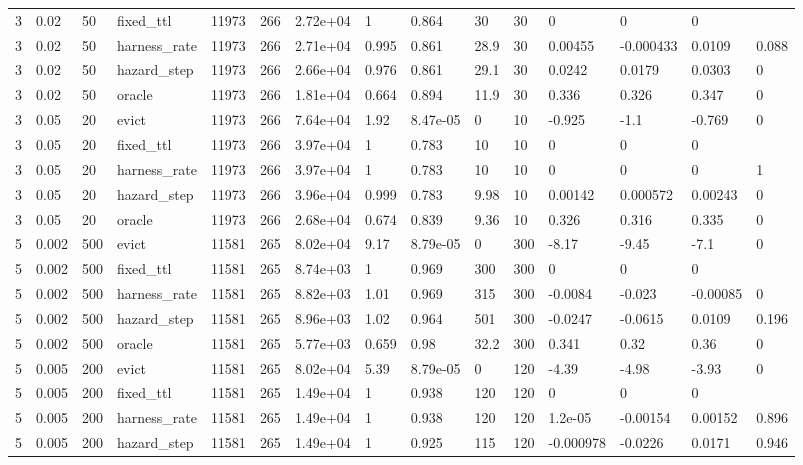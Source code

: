 \begin{tabular}{lllllllllllllll}
3 & 0.02 & 50 & fixed\_ttl & 11973 & 266 & 2.72e+04 & 1 & 0.864 & 30 & 30 & 0 & 0 & 0 &  \\
3 & 0.02 & 50 & harness\_rate & 11973 & 266 & 2.71e+04 & 0.995 & 0.861 & 28.9 & 30 & 0.00455 & -0.000433 & 0.0109 & 0.088 \\
3 & 0.02 & 50 & hazard\_step & 11973 & 266 & 2.66e+04 & 0.976 & 0.861 & 29.1 & 30 & 0.0242 & 0.0179 & 0.0303 & 0 \\
3 & 0.02 & 50 & oracle & 11973 & 266 & 1.81e+04 & 0.664 & 0.894 & 11.9 & 30 & 0.336 & 0.326 & 0.347 & 0 \\
3 & 0.05 & 20 & evict & 11973 & 266 & 7.64e+04 & 1.92 & 8.47e-05 & 0 & 10 & -0.925 & -1.1 & -0.769 & 0 \\
3 & 0.05 & 20 & fixed\_ttl & 11973 & 266 & 3.97e+04 & 1 & 0.783 & 10 & 10 & 0 & 0 & 0 &  \\
3 & 0.05 & 20 & harness\_rate & 11973 & 266 & 3.97e+04 & 1 & 0.783 & 10 & 10 & 0 & 0 & 0 & 1 \\
3 & 0.05 & 20 & hazard\_step & 11973 & 266 & 3.96e+04 & 0.999 & 0.783 & 9.98 & 10 & 0.00142 & 0.000572 & 0.00243 & 0 \\
3 & 0.05 & 20 & oracle & 11973 & 266 & 2.68e+04 & 0.674 & 0.839 & 9.36 & 10 & 0.326 & 0.316 & 0.335 & 0 \\
5 & 0.002 & 500 & evict & 11581 & 265 & 8.02e+04 & 9.17 & 8.79e-05 & 0 & 300 & -8.17 & -9.45 & -7.1 & 0 \\
5 & 0.002 & 500 & fixed\_ttl & 11581 & 265 & 8.74e+03 & 1 & 0.969 & 300 & 300 & 0 & 0 & 0 &  \\
5 & 0.002 & 500 & harness\_rate & 11581 & 265 & 8.82e+03 & 1.01 & 0.969 & 315 & 300 & -0.0084 & -0.023 & -0.00085 & 0 \\
5 & 0.002 & 500 & hazard\_step & 11581 & 265 & 8.96e+03 & 1.02 & 0.964 & 501 & 300 & -0.0247 & -0.0615 & 0.0109 & 0.196 \\
5 & 0.002 & 500 & oracle & 11581 & 265 & 5.77e+03 & 0.659 & 0.98 & 32.2 & 300 & 0.341 & 0.32 & 0.36 & 0 \\
5 & 0.005 & 200 & evict & 11581 & 265 & 8.02e+04 & 5.39 & 8.79e-05 & 0 & 120 & -4.39 & -4.98 & -3.93 & 0 \\
5 & 0.005 & 200 & fixed\_ttl & 11581 & 265 & 1.49e+04 & 1 & 0.938 & 120 & 120 & 0 & 0 & 0 &  \\
5 & 0.005 & 200 & harness\_rate & 11581 & 265 & 1.49e+04 & 1 & 0.938 & 120 & 120 & 1.2e-05 & -0.00154 & 0.00152 & 0.896 \\
5 & 0.005 & 200 & hazard\_step & 11581 & 265 & 1.49e+04 & 1 & 0.925 & 115 & 120 & -0.000978 & -0.0226 & 0.0171 & 0.946 \\

\end{tabular}
